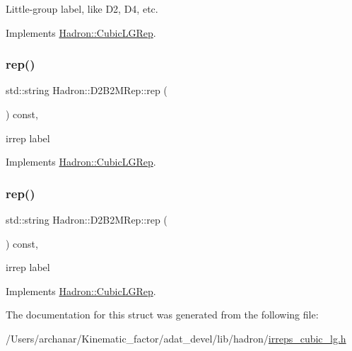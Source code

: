 Little-\/group label, like D2, D4, etc. 

Implements \mbox{\hyperlink{structHadron_1_1CubicLGRep_a9bdb14b519a611d21379ed96a3a9eb41}{Hadron\+::\+Cubic\+L\+G\+Rep}}.

\mbox{\label{structHadron_1_1D2B2MRep_a8559e189d9cd0f50fdf541f757661332}} 
\subsubsection{\texorpdfstring{rep()}{rep()}\hspace{0.1cm}{\footnotesize\ttfamily [1/2]}}
{\footnotesize\ttfamily std\+::string Hadron\+::\+D2\+B2\+M\+Rep\+::rep (\begin{DoxyParamCaption}{ }\end{DoxyParamCaption}) const\hspace{0.3cm}{\ttfamily [inline]}, {\ttfamily [virtual]}}

irrep label 

Implements \mbox{\hyperlink{structHadron_1_1CubicLGRep_a50f5ddbb8f4be4cee0106fa9e8c75e6c}{Hadron\+::\+Cubic\+L\+G\+Rep}}.

\mbox{\label{structHadron_1_1D2B2MRep_a8559e189d9cd0f50fdf541f757661332}} 
\subsubsection{\texorpdfstring{rep()}{rep()}\hspace{0.1cm}{\footnotesize\ttfamily [2/2]}}
{\footnotesize\ttfamily std\+::string Hadron\+::\+D2\+B2\+M\+Rep\+::rep (\begin{DoxyParamCaption}{ }\end{DoxyParamCaption}) const\hspace{0.3cm}{\ttfamily [inline]}, {\ttfamily [virtual]}}

irrep label 

Implements \mbox{\hyperlink{structHadron_1_1CubicLGRep_a50f5ddbb8f4be4cee0106fa9e8c75e6c}{Hadron\+::\+Cubic\+L\+G\+Rep}}.



The documentation for this struct was generated from the following file\+:\begin{DoxyCompactItemize}
\item 
/\+Users/archanar/\+Kinematic\+\_\+factor/adat\+\_\+devel/lib/hadron/\mbox{\hyperlink{lib_2hadron_2irreps__cubic__lg_8h}{irreps\+\_\+cubic\+\_\+lg.\+h}}\end{DoxyCompactItemize}
